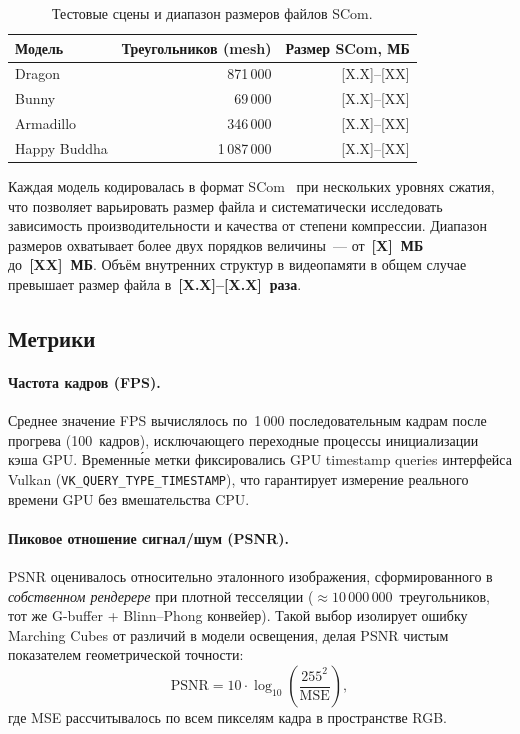 \begin{table}[h]
  \centering
  \caption{Тестовые сцены и диапазон размеров файлов SCom.}
  \label{tab:scenes}
  \begin{tabular}{lrr}
    \toprule
    \textbf{Модель} & \textbf{Треугольников (mesh)} & \textbf{Размер SCom, МБ} \\
    \midrule
    Dragon       &   871\,000 & [X.X]--[XX] \\
    Bunny        &    69\,000 & [X.X]--[XX] \\
    Armadillo    &   346\,000 & [X.X]--[XX] \\
    Happy Buddha & 1\,087\,000 & [X.X]--[XX] \\
    \bottomrule
  \end{tabular}
\end{table}

Каждая модель кодировалась в формат SCom~\cite{scom2025} при нескольких
уровнях сжатия, что позволяет варьировать размер файла и систематически
исследовать зависимость производительности и качества от степени компрессии.
Диапазон размеров охватывает более двух порядков величины~---
от~\textbf{[X]~МБ} до~\textbf{[XX]~МБ}.
Объём внутренних структур в видеопамяти в общем случае превышает размер файла
в~\textbf{[X.X]--[X.X]~раза}.

\subsection{Метрики}

\paragraph{Частота кадров (FPS).}
Среднее значение FPS вычислялось по~1\,000 последовательным кадрам после
прогрева (100~кадров), исключающего переходные процессы инициализации кэша GPU.
Временны́е метки фиксировались GPU timestamp queries интерфейса Vulkan
(\texttt{VK\_QUERY\_TYPE\_TIMESTAMP}), что гарантирует измерение реального
времени GPU без вмешательства CPU.

\paragraph{Пиковое отношение сигнал/шум (PSNR).}
PSNR оценивалось относительно эталонного изображения, сформированного
в \emph{собственном рендерере} при плотной тесселяции
(${\approx}10\,000\,000$~треугольников, тот же G-buffer + Blinn–Phong конвейер).
Такой выбор изолирует ошибку Marching Cubes от различий в модели освещения,
делая PSNR чистым показателем геометрической точности:
\[
  \mathrm{PSNR} = 10 \cdot \log_{10}\!\left(\frac{255^2}{\mathrm{MSE}}\right),
\]
где MSE рассчитывалось по всем пикселям кадра в пространстве RGB.

